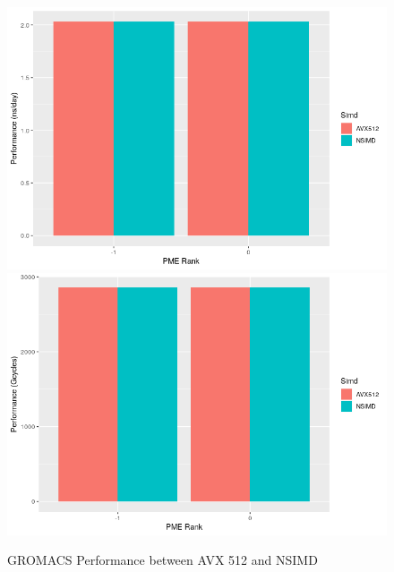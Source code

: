 \begin{figure}[!h]
\centering
        \includegraphics[scale=0.8]{AVX512.png}
        \includegraphics[scale=0.8]{AVX512_2.png}
        \caption{GROMACS Performance between AVX 512 and NSIMD}
        \label{fg:f5}
\end{figure}






